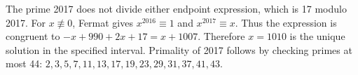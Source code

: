 The prime 2017 does not divide either endpoint expression, which is 17 modulo 2017. For $x\not\equiv0$, Fermat gives $x^{2016}\equiv1$ and $x^{2017}\equiv x$. Thus the expression is congruent to $-x+990+2x+17=x+1007$. Therefore $\boxed{x=1010}$ is the unique solution in the specified interval. Primality of 2017 follows by checking primes at most 44: $2,3,5,7,11,13,17,19,23,29,31,37,41,43$.
